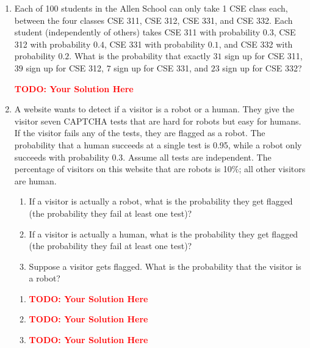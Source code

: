 \documentclass[12pt]{article}
\def\todo#1{\textcolor{red}{\textbf{#1}}}
\renewcommand{\|}{\mid}
\begin{document}
\begin{enumerate}
\item Each of 100 students in the Allen School can only take 1 CSE class each, between the four classes CSE 311, CSE 312, CSE 331, and CSE 332. Each student (independently of others) takes CSE 311 with probability $0.3$, CSE 312 with probability $0.4$, CSE 331 with probability $0.1$, and CSE 332 with probability $0.2$. What is the probability that exactly $31$ sign up for CSE 311, $39$ sign up for CSE 312, $7$ sign up for CSE 331, and $23$ sign up for CSE 332?

\begin{tcolorbox}
\todo{TODO: Your Solution Here}
\end{tcolorbox}


\item A website wants to detect if a visitor is a robot or a human. They give the visitor seven CAPTCHA tests that are hard for robots but easy for humans. If the visitor fails any of the tests, they are flagged as a robot. The probability that a human succeeds at a single test is 0.95, while a robot only succeeds with probability 0.3. Assume all tests are independent. The
percentage of visitors on this website that are robots is 10\%; all other visitors are human.
\begin{enumerate}
    \item If a visitor is actually a robot, what is the probability they get flagged (the probability they fail at least one test)?
    \item If a visitor is actually a human, what is the probability they get flagged (the probability they fail at least one test)?
    \item Suppose a visitor gets flagged. What is the probability that the visitor is a robot?
\end{enumerate}

\begin{tcolorbox}
\begin{enumerate}
\item \todo{TODO: Your Solution Here}
\item \todo{TODO: Your Solution Here}
\item \todo{TODO: Your Solution Here}
\end{enumerate}
\end{tcolorbox}



\end{enumerate}
\end{document}
